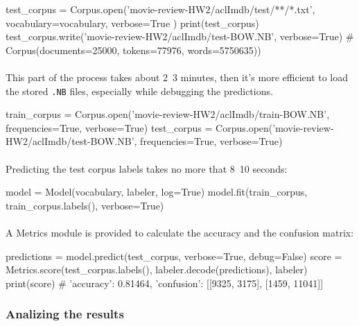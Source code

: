 \documentclass{article}
\begin{document}
\begin{python}
    test_corpus = Corpus.open('movie-review-HW2/aclImdb/test/**/*.txt',
    vocabulary=vocabulary,
    verbose=True
)
print(test_corpus)
test_corpus.write('movie-review-HW2/aclImdb/test-BOW.NB', verbose=True)
# Corpus(documents=25000, tokens=77976, words=5750635))
\end{python}

\paragraph{} This part of the process takes about 2~3 minutes, then it's more efficient to load the stored \texttt{.NB} files, especially while debugging the predictions.

\begin{python}
train_corpus = Corpus.open('movie-review-HW2/aclImdb/train-BOW.NB', frequencies=True, verbose=True)
test_corpus = Corpus.open('movie-review-HW2/aclImdb/test-BOW.NB', frequencies=True, verbose=True)
\end{python}

\paragraph{} Predicting the test corpus labels takes no more that 8~10 seconds:

\begin{python}
model = Model(vocabulary, labeler, log=True)
model.fit(train_corpus, train_corpus.labels(), verbose=True)
\end{python}

\paragraph{} A Metrics module is provided to calculate the accuracy and the confusion matrix:

\begin{python}
predictions = model.predict(test_corpus, verbose=True, debug=False)
score = Metrics.score(test_corpus.labels(), labeler.decode(predictions), labeler)
print(score)
# {'accuracy': 0.81464, 'confusion': [[9325, 3175], [1459, 11041]]}
\end{python}

\clearpage

\subsubsection*{Analizing the results}
\end{document}
